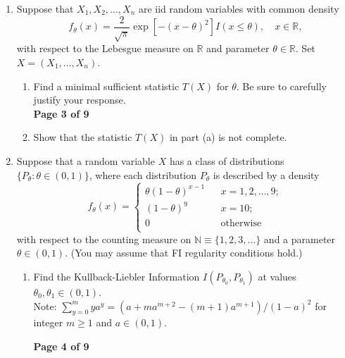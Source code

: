 \documentclass[12pt]{article}
\begin{document}
\begin{enumerate}





\item Suppose that $X_1,X_2,\ldots,X_n$ are iid random variables with common density
\[
f_\theta(x) = \frac{2}{\sqrt{\pi}} \exp\left[-(x-\theta)^2\right] I(x \leq \theta),\quad x\in\mathbb{R},
\]
with respect to the Lebesgue measure on $\mathbb{R}$ and parameter $\theta \in \mathbb{R}$.
Set $X=(X_1,\ldots,X_n)$.

\begin{enumerate}
\item Find a minimal sufficient statistic $T(X)$ for $\theta$.  Be sure to carefully justify your response.\\[6in]

\newpage
\textbf{\hspace*{1cm} \hfill Page 3 of 9}


\item Show that the statistic $T(X)$ in part (a) is not complete. \\[4.4in]

\end{enumerate}

\item Suppose that a random variable $X$ has a class of distributions $\{P_\theta : \theta \in (0,1) \}$, where each distribution $P_\theta$ is described by a density
\[
f_\theta(x)  = \left\{\begin{array}{lcl}
\theta (1-\theta)^{x-1} && x=1,2,\ldots,9;\\
(1-\theta)^9&& x=10;\\
0 && \mbox{otherwise}\\
\end{array} \right.
\]
with respect to the counting measure on $\mathbb{N}\equiv \{1,2,3,\ldots\}$ and a parameter $\theta \in (0,1)$.  (You may assume that  FI regularity conditions hold.)

\begin{enumerate}
\item Find the Kullback-Liebler Information   $I(P_{\theta_0},P_{\theta_1})$  at values $\theta_0,\theta_1\in(0,1)$.\\[.1cm]
Note: $\sum_{y=0}^m y a^y = (a+ ma^{m+2}-(m+1)a^{m+1})/(1-a)^2$ for integer $m\geq 1$ and $a\in (0,1)$.

\newpage
\textbf{\hspace*{1cm} \hfill Page 4 of 9}




\end{enumerate}
\end{enumerate}
\end{document}
